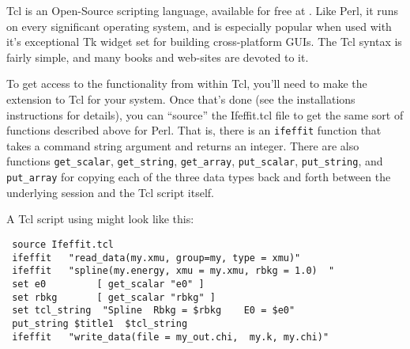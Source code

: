 Tcl\cite{TclBook} is an Open-Source scripting language, available for free
at {\WWWtcl}.  Like Perl, it runs on every significant operating system,
and is especially popular when used with it's exceptional Tk widget set for
building cross-platform GUIs.  The Tcl syntax is fairly simple, and many
books and web-sites are devoted to it.

To get access to the {\ifeffit} functionality from within Tcl, you'll need
to make the {\ifeffit} extension to Tcl for your system.  Once that's done
(see the installations instructions for details), you can ``source'' the
Ifeffit.tcl file to get the same sort of functions described above for
Perl.  That is, there is an {\tt{ifeffit}} function that takes a command
string argument and returns an integer.  There are also functions
{\tt{get\_scalar}}, {\tt{get\_string}}, {\tt{get\_array}},
{\tt{put\_scalar}}, {\tt{put\_string}}, and {\tt{put\_array}} for copying 
each of the three data types back and forth between the underlying
{\ifeffit} session and the Tcl script itself.

A Tcl script using {\ifeffit} might look like this:

\begin{verbatim}
 source Ifeffit.tcl
 ifeffit   "read_data(my.xmu, group=my, type = xmu)"
 ifeffit   "spline(my.energy, xmu = my.xmu, rbkg = 1.0)  "
 set e0         [ get_scalar "e0" ]
 set rbkg       [ get_scalar "rbkg" ]
 set tcl_string  "Spline  Rbkg = $rbkg    E0 = $e0"
 put_string $title1  $tcl_string
 ifeffit   "write_data(file = my_out.chi,  my.k, my.chi)"

\end{verbatim} %
